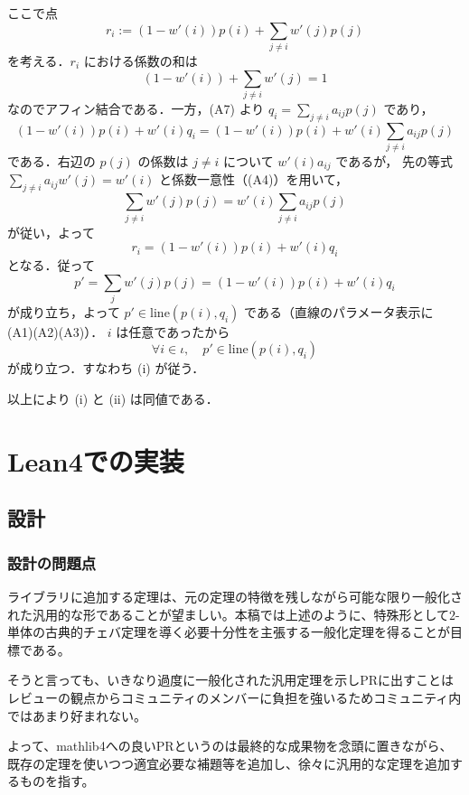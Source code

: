 \documentclass[a4paper,12pt]{bxjsbook}
\makeatletter
\newlength{\customindent}
\newenvironment{body}{
  \par
  \begingroup
  \setlength{\leftskip}{\customindent}
  \setlength{\rightskip}{0pt}
  \setlength{\parindent}{1em}
  \setlength{\displayindent}{\customindent}
  \setlength{\displaywidth}{\dimexpr\linewidth-\customindent\relax}
}{
  \par
  \endgroup
}
\theoremstyle{theorem}
\renewenvironment{proof}[1][\proofname]{%
  \par\pushQED{\qed}%
  \normalfont
  \topsep6\p@\@plus6\p@\relax
  \list{}{%
    \leftmargin=\customindent
    \rightmargin=0pt
    \labelwidth=0pt
    \labelsep=0pt
    \itemindent=0pt
    \listparindent=0pt
    \parsep=0pt
  }%
  \item[\itshape #1\@addpunct{.}\hspace{0.5em}]%
  \setlength{\displayindent}{\customindent}%
  \setlength{\displaywidth}{\dimexpr\linewidth-\customindent\relax}%
  \ignorespaces
}{%
  \popQED\endlist\@endpefalse
}
\makeatother
\begin{document}
\begin{body}
\begin{proof}
        ここで点
        \[
        r_i:=(1-w'(i))p(i)+\sum_{j\neq i}w'(j)p(j)
        \]
        を考える．$r_i$ における係数の和は
        \[
        (1-w'(i))+\sum_{j\neq i}w'(j)=1
        \]
        なのでアフィン結合である．一方，(A7) より $q_i=\sum_{j\neq i}a_{ij}p(j)$ であり，
        \[
        (1-w'(i))p(i)+w'(i)q_i
        =(1-w'(i))p(i)+w'(i)\sum_{j\neq i}a_{ij}p(j)
        \]
        である．右辺の $p(j)$ の係数は $j\neq i$ について $w'(i)a_{ij}$ であるが，
        先の等式 $\sum_{j\neq i}a_{ij}w'(j)=w'(i)$ と係数一意性（(A4)）を用いて，
        \[
        \sum_{j\neq i}w'(j)p(j)=w'(i)\sum_{j\neq i}a_{ij}p(j)
        \]
        が従い，よって
        \[
        r_i=(1-w'(i))p(i)+w'(i)q_i
        \]
        となる．従って
        \[
        p'=\sum_{j}w'(j)p(j)=(1-w'(i))p(i)+w'(i)q_i
        \]
        が成り立ち，よって $p'\in \mathrm{line}(p(i),q_i)$ である（直線のパラメータ表示に (A1)(A2)(A3)）．
        $i$ は任意であったから
        \[
        \forall i\in\iota,\quad p'\in \mathrm{line}(p(i),q_i)
        \]
        が成り立つ．すなわち (i) が従う．

        以上により (i) と (ii) は同値である．
    \end{proof}



    \chapter{Lean4での実装}

    \section{設計}
    \subsection{設計の問題点}
    \begin{body}
        \indent ライブラリに追加する定理は、元の定理の特徴を残しながら可能な限り一般化された汎用的な形であることが望ましい。本稿では上述のように、特殊形として$2$-単体の古典的チェバ定理を導く必要十分性を主張する一般化定理を得ることが目標である。

        \indent そうと言っても、いきなり過度に一般化された汎用定理を示しPRに出すことはレビューの観点からコミュニティのメンバーに負担を強いるためコミュニティ内ではあまり好まれない。

        \indent よって、mathlib4への良いPRというのは最終的な成果物を念頭に置きながら、既存の定理を使いつつ適宜必要な補題等を追加し、徐々に汎用的な定理を追加するものを指す。


\end{body}
\end{body}
\end{document}
